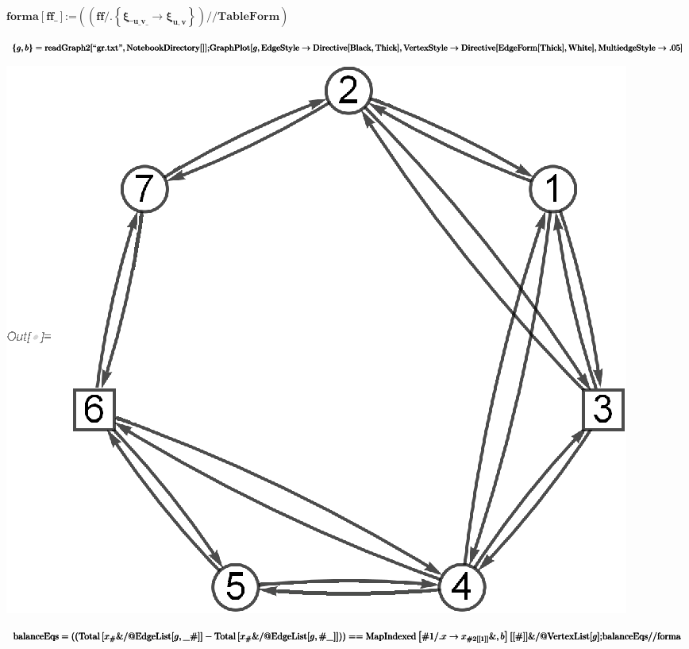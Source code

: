 \documentclass{article}
\newcommand{\unicode}[1]{{}}
\begin{document}
\begin{doublespace}
\noindent\(\pmb{\text{forma}[\text{ff$\_$}]\text{:=}\left(\left(\text{ff}\text{/.}\left\{\xi \__{\text{u$\_$}\unicode{f3d5}\text{v$\_$}}\to \xi _{u,v}\right\}\right)\text{//}\text{TableForm}\right)}\)
\end{doublespace}

\begin{doublespace}
\noindent\(\pmb{\text{}}\\
\pmb{\{g,b\}=\text{readGraph2}[\text{{``}gr.txt{''}},\text{NotebookDirectory}[]];}\\
\pmb{\text{GraphPlot}[g,\text{EdgeStyle}\to \text{Directive}[\text{Black},\text{Thick}], \text{VertexStyle}\to \text{Directive}[\text{EdgeForm}[\text{Thick}],\text{White}],\text{MultiedgeStyle}\to
.05]}\)
\end{doublespace}

\includegraphics{k1_gr1.eps}

\begin{doublespace}
\noindent\(\pmb{\text{balanceEqs}=\left(\left(\text{Total}\left[x_{\#}\&\text{/@}\text{EdgeList}[g,\_\unicode{f3d5}\#]\right]-\text{Total}\left[x_{\#}\&\text{/@}\text{EdgeList}[g,\#\unicode{f3d5}\_]\right]\right)\right)==\text{MapIndexed}\left[\text{$\#$1}\text{/.}x\to
x_{\text{$\#$2}[[1]]}\&,b\right][[\#]]\&\text{/@}\text{VertexList}[g];}\\
\pmb{\text{balanceEqs}\text{//}\text{forma}}\)
\end{doublespace}
\end{document}
